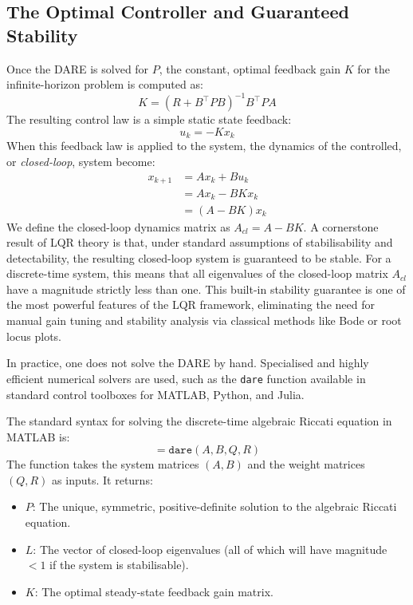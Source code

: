 \subsection{The Optimal Controller and Guaranteed Stability}
Once the DARE is solved for $P$, the constant, optimal feedback gain $K$ for the infinite-horizon problem is computed as:
\begin{equation*}
	K = (R + B^\top P B)^{-1} B^\top P A
\end{equation*}
The resulting control law is a simple static state feedback:
\begin{equation*}
	u_k = -K x_k
\end{equation*}
When this feedback law is applied to the system, the dynamics of the controlled, or \textit{closed-loop}, system become:
\begin{align*}
	x_{k+1} &= A x_k + Bu_k \\
	&= A x_k - B K x_k \\
	&= (A - B K)x_k
\end{align*}
We define the closed-loop dynamics matrix as $A_{cl} = A - B K$. A cornerstone result of LQR theory is that, under standard assumptions of stabilisability and detectability, the resulting closed-loop system is guaranteed to be stable. For a discrete-time system, this means that all eigenvalues of the closed-loop matrix $A_{cl}$ have a magnitude strictly less than one. This built-in stability guarantee is one of the most powerful features of the LQR framework, eliminating the need for manual gain tuning and stability analysis via classical methods like Bode or root locus plots.

In practice, one does not solve the DARE by hand. Specialised and highly efficient numerical solvers are used, such as the \texttt{dare} function available in standard control toolboxes for MATLAB, Python, and Julia.

The standard syntax for solving the discrete-time algebraic Riccati equation in MATLAB is:
\begin{equation*}
	[P, L, K] = \texttt{dare}(A, B, Q, R)
\end{equation*}
The function takes the system matrices $(A, B)$ and the weight matrices $(Q, R)$ as inputs. It returns:
\begin{itemize}
	\item $P$: The unique, symmetric, positive-definite solution to the algebraic Riccati equation.
	\item $L$: The vector of closed-loop eigenvalues (all of which will have magnitude $<1$ if the system is stabilisable).
	\item $K$: The optimal steady-state feedback gain matrix.
\end{itemize}

